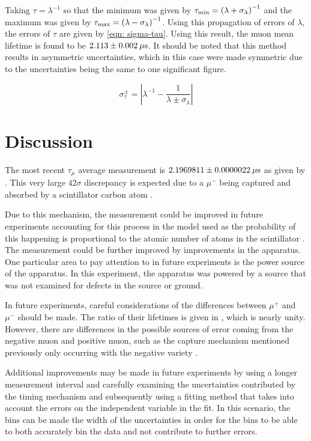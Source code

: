 \documentclass[reprint]{revtex4-1}
\begin{document}
Taking $\tau = \lambda^{-1}$ so that the minimum was given by $\tau_{\rm{min}} = \left( \lambda + \sigma_{\lambda} \right)^{-1}$ and the maximum was given by $\tau_{\rm{max}} = \left( \lambda - \sigma_{\lambda} \right)^{-1}$. Using this propagation of errors of $\lambda$, the errors of $\tau$ are given by \cref{eqn: sigma-tau}. Using this result, the muon mean lifetime is found to be $2.113 \pm 0.002\:\rm{\mu s}$. It should be noted that this method results in asymmetric uncertainties, which in this case were made symmetric due to the uncertainties being the same to one significant figure.

\begin{equation}
\sigma_{\tau}^{\pm} = \left| \lambda^{-1} - \frac{1}{\lambda \pm \sigma_\lambda} \right|
\label{eqn: sigma-tau}
\end{equation}

\section{Discussion}
The most recent $\tau_{\mu}$ average measurement is $2.1969811 \pm 0.0000022\:\rm{\mu s}$ as given by \cite{PDG}. This very large $42\sigma$ discrepancy is expected due to a $\mu^{-}$ being captured and absorbed by a scintillator carbon atom \cite{Chitwood2007}.

Due to this mechanism, the measurement could be improved in future experiments accounting for this process in the model used as the probability of this happening is proportional to the atomic number of atoms in the scintillator \cite{Chitwood2007}. The measurement could be further improved by improvements in the apparatus. One particular area to pay attention to in future experiments is the power source of the apparatus. In this experiment, the apparatus was powered by a source that was not examined for defects in the source or ground.

In future experiments, careful considerations of the differences between $\mu^{+}$ and $\mu^{-}$ should be made. The ratio of their lifetimes is given in \cite{PDG}, which is nearly unity. However, there are differences in the possible sources of error coming from the negative muon and positive muon, such as the capture mechanism mentioned previously only occurring with the negative variety \cite{Coan2005}.

Additional improvements may be made in future experiments by using a longer measurement interval and carefully examining the uncertainties contributed by the timing mechanism and subsequently using a fitting method that takes into account the errors on the independent variable in the fit. In this scenario, the bins can be made the width of the uncertainties in order for the bins to be able to both accurately bin the data and not contribute to further errors.



\end{document}
